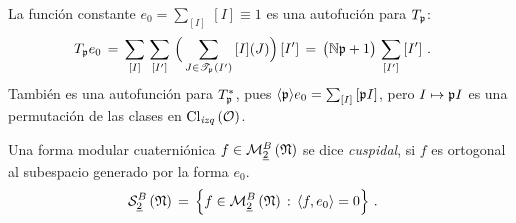 La funci\'{o}n constante $e_0=\sum_{[I]}\,[I]\equiv 1$ es una autofuci\'{o}n
para $T_{\frak p}$:
\begin{align*}
	T_{\frak p}e_0 & \,=\,\sum_{[I]}\,\sum_{[I']}\,\Big(
		\sum_{J\in\mathscr T_{\frak p}(I')}\,[I](J)\Big)\,[I'] \,=\,
		\big(\idnorm\frak p+1\big)\,\sum_{[I']}\,[I']
	\text{ .}
\end{align*}
%
Tambi\'{e}n es una autofunci\'{o}n para $T_{\frak p}^*$, pues
$\diamante{\frak p}e_0=\sum_{[I]}\,[\frak pI]$, pero $I\mapsto\frak pI$ es una
permutaci\'{o}n de las clases en $\lClass{\cal O}$.

\begin{defFormaCuspidalDefinida}\label{def:formacuspidaldefinida}
	Una forma modular cuaterni\'{o}nica
	$f\in\modularH[B]{2}{\frak{N}}$ se dice \emph{cuspidal},
	 si $f$
	es ortogonal al subespacio generado por la forma $e_0$.
	\begin{align*}
		\spitzH[B]{2}{\frak{N}} & \,=\,
			\Big\{ f\in\modularH[B]{2}{\frak{N}}\,:\,
					\langle f,e_0\rangle =0\Big\}
		\text{ .}
	\end{align*}
\end{defFormaCuspidalDefinida}

